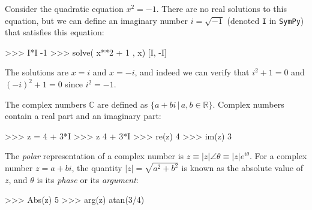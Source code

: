 % 
Consider the quadratic equation $x^2=-1$.
There are no real solutions to this equation,
but we can define an imaginary number $i =\sqrt{-1}$ (denoted \texttt{I} in \texttt{SymPy}) that satisfies this equation:

\small
\begin{verbatimtab}
>>> I*I
-1
>>> solve( x**2 + 1 , x)
[I, -I]
\end{verbatimtab}
\normalsize

\noindent
The solutions are $x=i$ and $x=-i$,
and indeed we can verify that $i^2+1=0$ and $(-i)^2+1=0$
since $i^2=-1$.

The complex numbers $\mathbb{C}$ are defined as $\{ a+bi \,|\, a,b \in \mathbb{R} \}$.
Complex numbers contain a real part and an imaginary part:

\small
\begin{verbatimtab}
>>> z = 4 + 3*I
>>> z 
4 + 3*I
>>> re(z)
4
>>> im(z)
3 
\end{verbatimtab}
\normalsize

\noindent
The \emph{polar} representation of a complex number is $z\!\equiv\!|z|\angle\theta\!\equiv \!|z|e^{i\theta}$.
For a complex number $z=a+bi$, 
the quantity $|z|=\sqrt{a^2+b^2}$ is known as the absolute value of $z$,
and $\theta$ is its \emph{phase} or its \emph{argument}:



\small
\begin{verbatimtab}
>>> Abs(z)
5
>>> arg(z)
atan(3/4)
\end{verbatimtab}
\normalsize

